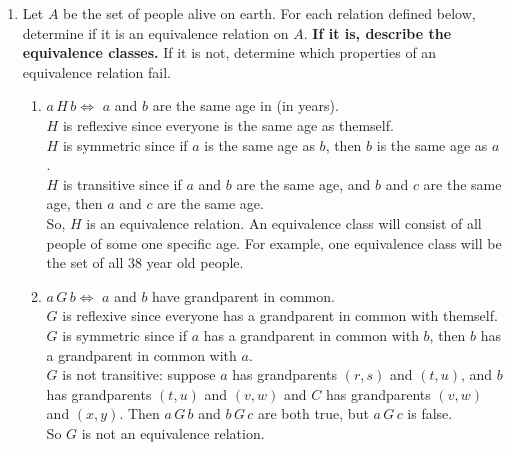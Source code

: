 \documentclass[11pt]{amsart}
\begin{document}
\begin{enumerate}

\item Let $A$ be the set of people alive on earth. 
For each relation defined below, determine if
it is an equivalence relation on $A$. {\bf If it is, describe the equivalence classes.}
If it is not, determine which properties of an equivalence relation fail.\\[3pt]

\begin{enumerate}

\item $a\,H\,b \iff$  $a$ and $b$ are the same age in (in years).\\[3pt]
{\color{blue}
$H$ is reflexive since everyone is the same age as themself.\\
$H$ is symmetric since if $a$ is the same age as $b$, then $b$ is the same age as $a$.\\
$H$ is transitive since if $a$ and $b$ are the same age, and $b$ and $c$ are the same age,
then $a$ and $c$ are the same age.\\
So, $H$ is an equivalence relation. An equivalence class will consist of all people of some one specific age. 
For example, one equivalence
class will be the set of all $38$ year old people.\\[3pt]
}

\item $a\,G\,b \iff$  $a$ and $b$ have grandparent in common.\\[3pt]
{\color{blue}
$G$ is reflexive since everyone has a grandparent in common with themself.\\
$G$ is symmetric since if $a$ has a grandparent in common with $b$, then $b$ has a grandparent in common with  $a$.\\
$G$ is not transitive: suppose $a$ has grandparents $(r,s)$ and $(t,u)$, and $b$ has grandparents 
$(t,u)$ and $(v,w)$  and $C$ has grandparents $(v,w)$ and $(x,y)$. Then $a\, G\, b$ and $b\,G\,c$ are both
true, but $a\,G\,c$ is false.\\
So $G$ is not an equivalence relation.\\[5pt]
}

\end{enumerate}


\end{enumerate}
\end{document}
